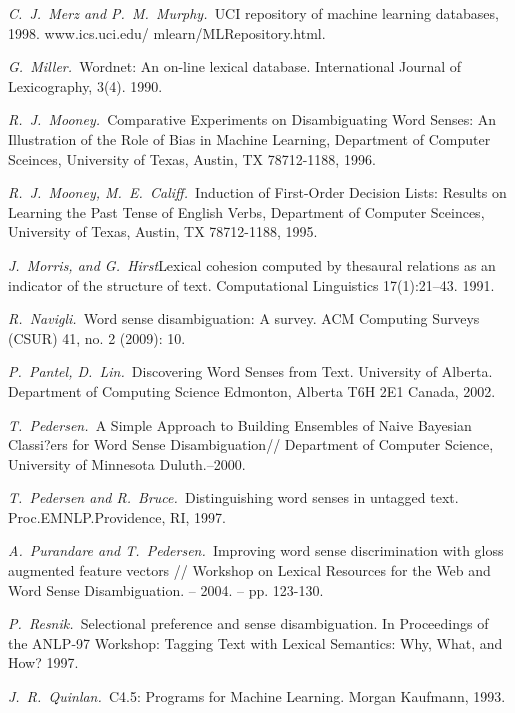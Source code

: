\documentclass{article}
\begin{document}
\begin{articletext}
\begin{thebibliography}{9}
\textit{C.~J.~Merz and P.~M.~Murphy.~}UCI repository of machine learning databases, 1998. www.ics.uci.edu/ mlearn/MLRepository.html.

\textit{G.~Miller.~}Wordnet: An on-line lexical database. International Journal of Lexicography, 3(4). 1990.

\textit{R.~J.~Mooney.~}Comparative Experiments on Disambiguating Word Senses:
An Illustration of the Role of Bias in Machine Learning, Department of Computer Sceinces, University of Texas, Austin, TX 78712-1188, 1996.

\textit{R.~J.~Mooney, M.~E.~Califf.~}Induction of First-Order Decision Lists: Results on Learning the Past Tense of English Verbs, Department of Computer Sceinces, University of Texas, Austin, TX 78712-1188, 1995.

\textit{J.~Morris, and G.~Hirst}Lexical cohesion computed by thesaural relations as an indicator of the structure of text. Computational Linguistics 17(1):21–43. 1991. 

\textit{R.~Navigli.~}Word sense disambiguation: A survey. ACM Computing Surveys (CSUR) 41, no. 2 (2009): 10.

\textit{P.~Pantel, D.~Lin.~}Discovering Word Senses from Text. University of Alberta. Department of Computing Science Edmonton, Alberta T6H 2E1 Canada, 2002.

\textit{T.~Pedersen.~}A Simple Approach to Building Ensembles of Naive Bayesian Classi?ers for Word Sense Disambiguation// Department of Computer Science, University of Minnesota Duluth.–2000.

\textit{T.~Pedersen and R.~Bruce.~}Distinguishing word senses in untagged text. Proc.EMNLP.Providence, RI, 1997.

\textit{A.~Purandare and T.~Pedersen.~}Improving word sense discrimination with gloss augmented feature vectors // Workshop on Lexical Resources for the Web and Word Sense Disambiguation. – 2004. – pp. 123-130. 

\textit{P.~Resnik.~}Selectional preference and sense disambiguation. In Proceedings of the ANLP-97 Workshop: Tagging Text with Lexical Semantics: Why, What, and How? 1997.

\textit{J.~R.~Quinlan.~}C4.5: Programs for Machine Learning. Morgan Kaufmann, 1993. 


\end{thebibliography}
\end{articletext}
\end{document}

